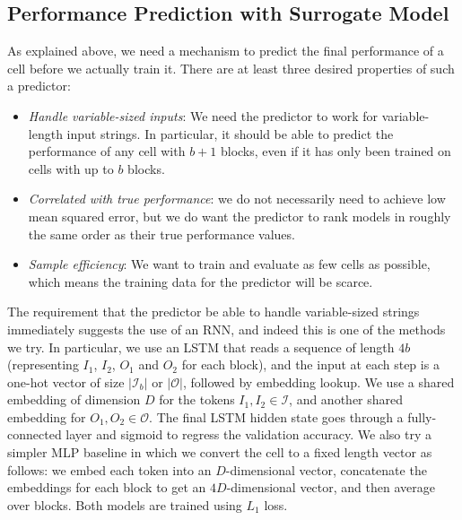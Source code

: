 \documentclass[runningheads]{llncs}
\begin{document}
\subsection{Performance Prediction with Surrogate Model}\label{sec:surrogate}As explained above, we need a mechanism to predict the final
performance of a cell before we actually train it.
There are at least three desired properties of such a predictor:
\begin{itemize}
    \item \textit{Handle variable-sized inputs}: We need the predictor to work for variable-length input strings.
    In particular, it should be able to predict the performance of any cell with $b+1$ blocks, even if it has only been trained on cells with up to $b$ blocks.
    
  
  \item \textit{Correlated with  true performance}: we do not necessarily need to achieve low mean squared error, but we do want the predictor to rank models in roughly the same order as their true performance values.
 
    
    \item \textit{Sample efficiency}: We want to train and evaluate as few cells as possible, which means the training data for the predictor will be scarce. 
\end{itemize}

The requirement that the predictor be able to handle variable-sized strings 
immediately suggests the use of an RNN, and indeed this is one of the methods we try.
In particular, we use an LSTM that reads a sequence of length $4b$
(representing $I_1$, $I_2$, $O_1$ and $O_2$ for each block), and the input at each step is a one-hot vector of size $|\mathcal{I}_b|$ or $|\mathcal{O}|$, followed by embedding lookup.
We use a shared embedding of dimension $D$ for the tokens $I_1, I_2 \in \mathcal{I}$,
and another shared embedding for $O_1, O_2 \in \mathcal{O}$.
The final LSTM hidden state goes through a fully-connected layer and sigmoid to regress the validation accuracy. 
We also try a simpler MLP baseline in which we convert the cell to a fixed length vector as follows:
we embed each token into an $D$-dimensional vector,
concatenate the embeddings for each block to get an $4D$-dimensional vector,
and then average over blocks.
Both models are trained using $L_1$ loss.
\end{document}
